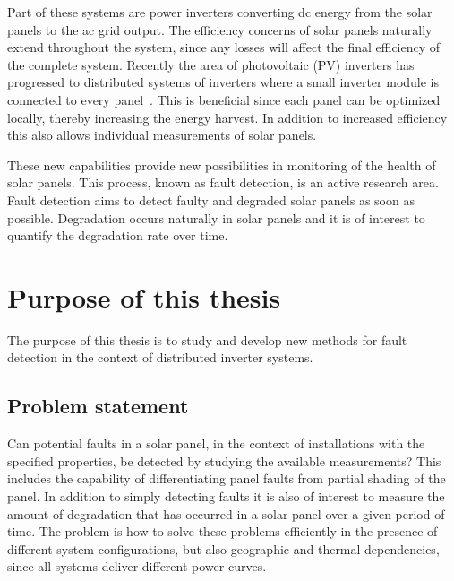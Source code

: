 Part of these systems are power inverters converting dc energy from the solar panels to the ac grid output.
The efficiency concerns of solar panels naturally extend throughout the system, since any losses will affect the final efficiency of the complete system.
Recently the area of photovoltaic (PV) inverters has progressed to distributed systems of inverters where a small inverter module is connected to every panel~\cite{Roman2006}.
This is beneficial since each panel can be optimized locally, thereby increasing the energy harvest.
In addition to increased efficiency this also allows individual measurements of solar panels.

These new capabilities provide new possibilities in monitoring of the health of solar panels.
This process, known as fault detection, is an active research area.
Fault detection aims to detect faulty and degraded solar panels as soon as possible. 
Degradation occurs naturally in solar panels and it is of interest to quantify the degradation rate over time.

\section{Purpose of this thesis}
The purpose of this thesis is to study and develop new methods for fault detection in the context of distributed inverter systems.

\subsection*{Problem statement}
Can potential faults in a solar panel, in the context of installations with the specified properties, be detected by studying the available measurements?
This includes the capability of differentiating panel faults from partial shading of the panel.
In addition to simply detecting faults it is also of interest to measure the amount of degradation that has occurred in a solar panel over a given period of time.
The problem is how to solve these problems efficiently in the presence of different system configurations, but also geographic and thermal dependencies, since all systems deliver different power curves.

\newpage
